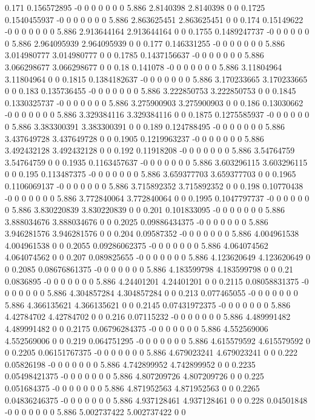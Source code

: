 {0.171 0.156572895 -0 0 0 0 0 0 0 5.886 2.8140398 2.8140398 0 0
0.1725 0.1540455937 -0 0 0 0 0 0 0 5.886 2.863625451 2.863625451 0 0
0.174 0.15149622 -0 0 0 0 0 0 0 5.886 2.913644164 2.913644164 0 0
0.1755 0.1489247737 -0 0 0 0 0 0 0 5.886 2.964095939 2.964095939 0 0
0.177 0.146331255 -0 0 0 0 0 0 0 5.886 3.014980777 3.014980777 0 0
0.1785 0.1437156637 -0 0 0 0 0 0 0 5.886 3.066298677 3.066298677 0 0
0.18 0.141078 -0 0 0 0 0 0 0 5.886 3.11804964 3.11804964 0 0
0.1815 0.1384182637 -0 0 0 0 0 0 0 5.886 3.170233665 3.170233665 0 0
0.183 0.135736455 -0 0 0 0 0 0 0 5.886 3.222850753 3.222850753 0 0
0.1845 0.1330325737 -0 0 0 0 0 0 0 5.886 3.275900903 3.275900903 0 0
0.186 0.13030662 -0 0 0 0 0 0 0 5.886 3.329384116 3.329384116 0 0
0.1875 0.1275585937 -0 0 0 0 0 0 0 5.886 3.383300391 3.383300391 0 0
0.189 0.124788495 -0 0 0 0 0 0 0 5.886 3.437649728 3.437649728 0 0
0.1905 0.1219963237 -0 0 0 0 0 0 0 5.886 3.492432128 3.492432128 0 0
0.192 0.11918208 -0 0 0 0 0 0 0 5.886 3.54764759 3.54764759 0 0
0.1935 0.1163457637 -0 0 0 0 0 0 0 5.886 3.603296115 3.603296115 0 0
0.195 0.113487375 -0 0 0 0 0 0 0 5.886 3.659377703 3.659377703 0 0
0.1965 0.1106069137 -0 0 0 0 0 0 0 5.886 3.715892352 3.715892352 0 0
0.198 0.10770438 -0 0 0 0 0 0 0 5.886 3.772840064 3.772840064 0 0
0.1995 0.1047797737 -0 0 0 0 0 0 0 5.886 3.830220839 3.830220839 0 0
0.201 0.101833095 -0 0 0 0 0 0 0 5.886 3.888034676 3.888034676 0 0
0.2025 0.09886434375 -0 0 0 0 0 0 0 5.886 3.946281576 3.946281576 0 0
0.204 0.09587352 -0 0 0 0 0 0 0 5.886 4.004961538 4.004961538 0 0
0.2055 0.09286062375 -0 0 0 0 0 0 0 5.886 4.064074562 4.064074562 0 0
0.207 0.089825655 -0 0 0 0 0 0 0 5.886 4.123620649 4.123620649 0 0
0.2085 0.08676861375 -0 0 0 0 0 0 0 5.886 4.183599798 4.183599798 0 0
0.21 0.0836895 -0 0 0 0 0 0 0 5.886 4.24401201 4.24401201 0 0
0.2115 0.08058831375 -0 0 0 0 0 0 0 5.886 4.304857284 4.304857284 0 0
0.213 0.077465055 -0 0 0 0 0 0 0 5.886 4.366135621 4.366135621 0 0
0.2145 0.07431972375 -0 0 0 0 0 0 0 5.886 4.42784702 4.42784702 0 0
0.216 0.07115232 -0 0 0 0 0 0 0 5.886 4.489991482 4.489991482 0 0
0.2175 0.06796284375 -0 0 0 0 0 0 0 5.886 4.552569006 4.552569006 0 0
0.219 0.064751295 -0 0 0 0 0 0 0 5.886 4.615579592 4.615579592 0 0
0.2205 0.06151767375 -0 0 0 0 0 0 0 5.886 4.679023241 4.679023241 0 0
0.222 0.05826198 -0 0 0 0 0 0 0 5.886 4.742899952 4.742899952 0 0
0.2235 0.05498421375 -0 0 0 0 0 0 0 5.886 4.807209726 4.807209726 0 0
0.225 0.051684375 -0 0 0 0 0 0 0 5.886 4.871952563 4.871952563 0 0
0.2265 0.04836246375 -0 0 0 0 0 0 0 5.886 4.937128461 4.937128461 0 0
0.228 0.04501848 -0 0 0 0 0 0 0 5.886 5.002737422 5.002737422 0 0
}
